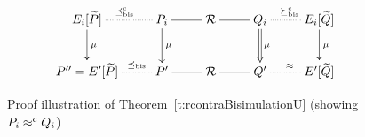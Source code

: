 \begin{figure}[ht]
\begin{displaymath}
  \xymatrix{
    {E_i[{\til P}]} \ar@{.}[r]^{\preceq^{\mathrm{c}}_{\mathrm{bis}}} \ar@{->}[d]^{\mu} & {P_i} \ar@{-}[r]
    \ar@{->}[d]^{\mu} & {\R} \ar@{-}[r] & {Q_i} \ar@{.}[r]^{\rcontr}
    \ar@{=>}[d]^{\mu} & {E_i[{\til Q}]} \ar@{->}[d]^{\mu} \\
    {P'' = E'[{\til P}]} \ar@{.}[r]^{\qquad\preceq_{\mathrm{bis}}} & {P'} \ar@{-}[r] & {\R} \ar@{-}[r] & {Q'} \ar@{.}[r]^{\wb} 
    & {E'[{\til Q}]} \\
  }
\end{displaymath}
\caption{Proof illustration of Theorem~\ref{t:rcontraBisimulationU}
  (showing $P_i \mathrel{\approx^{\rm{c}}} Q_i$)}
\label{fig:314}
\end{figure}

